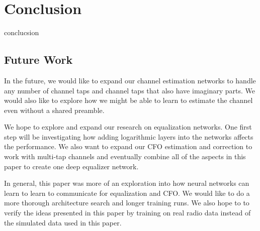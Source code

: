 \chapter{Conclusion}

conclucsion


\section{Future Work}

In the future, we would like to expand our channel estimation networks to handle any number of channel taps and channel taps that also have imaginary parts.
We would also like to explore how we might be able to learn to estimate the channel even without a shared preamble.

We hope to explore and expand our research on equalization networks.  One first step will be investigating how adding logarithmic layers into the networks affects the performance.  We also want to expand our CFO estimation and correction to work with multi-tap channels and eventually combine all of the aspects in this paper to create one deep equalizer network.

In general, this paper was more of an exploration into how neural networks can learn to learn to communicate for equalization and CFO.  We would like to do a more thorough architecture search and longer training runs.  We also hope to to verify the ideas presented in this paper by training on real radio data instead of the simulated data used in this paper.